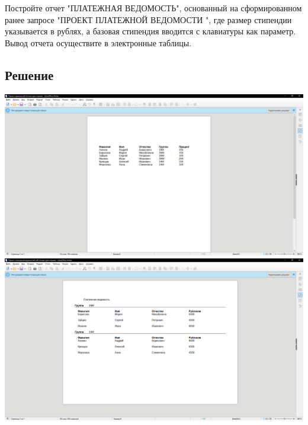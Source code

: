\documentclass[a4paper, 12pt]{article}
\begin{document}
Постройте  отчет  "ПЛАТЕЖНАЯ  ВЕДОМОСТЬ",  основанный  на 
сформированном ранее запросе "ПРОЕКТ ПЛАТЕЖНОЙ ВЕДОМОСТИ ", где 
размер стипендии указывается в рублях, а базовая стипендия вводится с 
клавиатуры  как  параметр.  Вывод  отчета  осуществите  в  электронные 
таблицы. 
\subsection{Решение}
\includegraphics[width=\textwidth]{"11-1.png"}\\
\includegraphics[width=\textwidth]{"11-2.png"}\\
\end{document}
